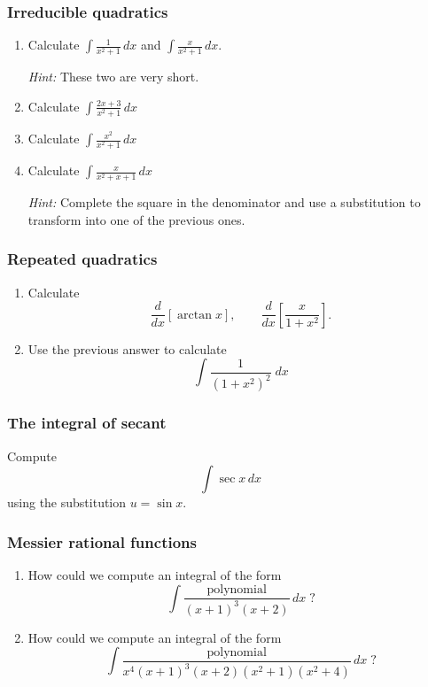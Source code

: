 \begin{frame}[t]
	\fontsize{13}{13}\selectfont
	\frametitle{Irreducible quadratics}

	\begin{enumerate}
		\item Calculate $\displaystyle \int \frac{1}{x^{2}+ 1}\, dx$ and $\displaystyle
			\int \frac{x}{x^{2}+1}\, dx$.
			\vspace{.2cm}

			\emph{Hint:} These two are very short.
			\vspace{.2cm}

		\item Calculate $\displaystyle \int \frac{2x+ 3}{x^{2}+ 1}\, dx$
			\vspace{.2cm}

		\item Calculate $\displaystyle \int \frac{x^{2}}{x^{2}+ 1}\, dx$
			\vspace{.2cm}

		\item Calculate $\displaystyle \int \frac{x}{x^{2}+ x + 1 }\, dx$
			\vspace{.2cm}

			\emph{Hint:} Complete the square in the denominator and use a substitution
			to transform into one of the previous ones.
	\end{enumerate}
\end{frame}

\begin{frame}[t]
	\frametitle{Repeated quadratics}

	\begin{enumerate}
		\item Calculate
			\[
				\frac{d}{dx}\left[ \arctan x \right], \quad \quad \frac{d}{dx}\left[ \frac{x}{1+x^{2}}
				\right].
			\]

		\item Use the previous answer to calculate
			\[
				\int \frac{1}{\left(1+x^{2}\right)^{2}}\; dx
			\]
	\end{enumerate}
\end{frame}

\begin{frame}[t]
	\frametitle{The integral of secant}

	Compute
	\[
		\int \sec x \, dx
	\]
	using the substitution $\displaystyle u = \sin x$.
\end{frame}

\begin{frame}[t]
	\frametitle{Messier rational functions}

	\begin{enumerate}
		\item How could we compute an integral of the form
			\[
				\int \frac{\text{polynomial}}{(x+1)^{3}(x+2)}\, dx \; ?
			\]

		\item How could we compute an integral of the form
			\[
				\int \frac{\text{polynomial}}{x^{4}(x+1)^{3}(x+2)(x^{2}+1)(x^{2}+4)}\,dx
				\; ?
			\]
	\end{enumerate}
\end{frame}

